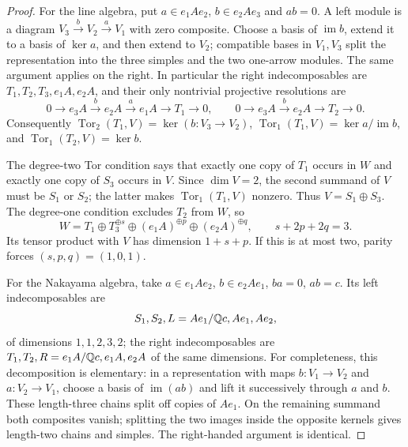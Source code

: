 \begin{proof}
For the line algebra, put $a\in e_1Ae_2$, $b\in e_2Ae_3$ and $ab=0$.
A left module is a diagram
$V_3\xrightarrow{b}V_2\xrightarrow{a}V_1$ with zero composite.
Choose a basis of $\operatorname{im}b$, extend it to a basis of
$\ker a$, and then extend to $V_2$; compatible bases in $V_1,V_3$
split the representation into the three simples and the two one-arrow
modules.  The same argument applies on the right.  In particular the
right indecomposables are $T_1,T_2,T_3,e_1A,e_2A$, and their only
nontrivial projective resolutions are
\[
 0\longrightarrow e_3A\xrightarrow{b}e_2A
   \xrightarrow{a}e_1A\longrightarrow T_1\longrightarrow0,
 \qquad
 0\longrightarrow e_3A\xrightarrow{b}e_2A
   \longrightarrow T_2\longrightarrow0.
\]
Consequently $\operatorname{Tor}_2(T_1,V)=\ker(b:V_3\to V_2)$,
$\operatorname{Tor}_1(T_1,V)=\ker a/\operatorname{im}b$, and
$\operatorname{Tor}_1(T_2,V)=\ker b$.

The degree-two Tor condition says that exactly one copy of $T_1$
occurs in $W$ and exactly one copy of $S_3$ occurs in $V$.  Since
$\dim V=2$, the second summand of $V$ must be $S_1$ or $S_2$;
the latter makes $\operatorname{Tor}_1(T_1,V)$ nonzero.  Thus
$V=S_1\oplus S_3$.  The degree-one condition excludes $T_2$ from
$W$, so
\[
 W=T_1\oplus T_3^{\oplus s}\oplus(e_1A)^{\oplus p}
                 \oplus(e_2A)^{\oplus q},\qquad
 s+2p+2q=3.
\]
Its tensor product with $V$ has dimension $1+s+p$.
If this is at most two, parity forces $(s,p,q)=(1,0,1)$.

For the Nakayama algebra, take
$a\in e_1Ae_2$, $b\in e_2Ae_1$, $ba=0$, $ab=c$.
Its left indecomposables are
\[
 S_1, S_2, L=Ae_1/\mathbb Q c, Ae_1, Ae_2,
\]
of dimensions $1,1,2,3,2$; the right indecomposables are
$T_1,T_2,R=e_1A/\mathbb Q c,e_1A,e_2A$ of the same dimensions.
For completeness, this decomposition is elementary: in a representation
with maps $b:V_1\to V_2$ and $a:V_2\to V_1$, choose a basis of
$\operatorname{im}(ab)$ and lift it successively through $a$ and $b$.
These length-three chains split off copies of $Ae_1$.
On the remaining summand both composites vanish; splitting the two
images inside the opposite kernels gives length-two chains and simples.
The right-handed argument is identical.


\end{proof}
